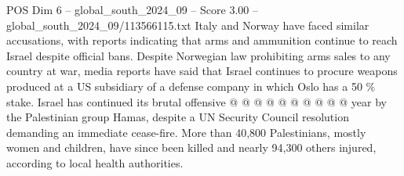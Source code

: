 \begin{textsample}{POS Dim 6 – global\_south\_2024\_09 – Score 3.00 – global\_south\_2024\_09/113566115.txt}
Italy and Norway have faced similar accusations, with reports indicating that arms and ammunition continue to reach Israel despite official bans.
Despite Norwegian law prohibiting arms sales to any country at war, media reports have said that Israel continues to procure weapons produced at a US subsidiary of a defense company in which Oslo has a 50 \% stake.
Israel has continued its brutal offensive @ @ @ @ @ @ @ @ @ @ year by the Palestinian group Hamas, despite a UN Security Council resolution demanding an immediate cease-fire.
More than 40,800 Palestinians, mostly women and children, have since been killed and nearly 94,300 others injured, according to local health authorities.

\end{textsample}
